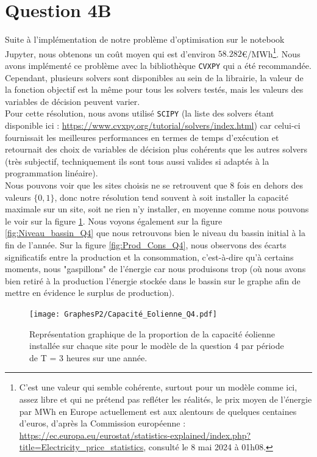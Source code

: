 \documentclass{article}
\begin{document}
\section*{Question 4B}
Suite à l'implémentation de notre problème d'optimisation sur le notebook Jupyter, nous obtenons 
un coût moyen qui est d'environ $\mathbf{58.282}$\euro/MWh\footnote{C'est une valeur qui semble cohérente, surtout pour un modèle comme ici, 
assez libre et qui ne prétend pas refléter les réalités, le prix moyen de l'énergie par MWh en Europe actuellement 
est aux alentours de quelques centaines d'euros, d'après la Commission européenne : 
\url{https://ec.europa.eu/eurostat/statistics-explained/index.php?title=Electricity_price_statistics}, 
consulté le 8 mai 2024 à 01h08.}.
Nous avons implémenté ce problème avec la bibliothèque \verb|CVXPY| qui a été recommandée. Cependant, plusieurs solvers sont disponibles au sein de la librairie, la valeur de la fonction objectif est la même pour tous les solvers testés, mais les valeurs des variables de décision peuvent varier.\\
Pour cette résolution, nous avons utilisé \verb|SCIPY| (la liste des solvers étant disponible ici : \url{https://www.cvxpy.org/tutorial/solvers/index.html})
car celui-ci fournissait les meilleures performances en termes de temps d'exécution et retournait des choix de variables de décision plus cohérents que les autres solvers 
(très subjectif, techniquement ils sont tous aussi valides si adaptés à la programmation linéaire). \\
Nous pouvons voir que les sites choisis ne se retrouvent que 8 fois en dehors des valeurs $\{0,1\}$, donc notre résolution
tend souvent à soit installer la capacité maximale sur un site, soit ne rien n'y installer, en moyenne comme nous pouvons le voir sur la figure \ref{fig:Capacité_Eolienne_Q4}.
Nous voyons également sur la figure \ref{fig:Niveau_bassin_Q4} que nous retrouvons bien le niveau du bassin initial à la fin de l'année. Sur la figure \ref{fig:Prod_Cons_Q4}, nous observons des écarts significatifs entre la production et la consommation, c'est-à-dire 
qu'à certains moments, nous "gaspillons" de l'énergie car nous produisons trop (où nous avons bien retiré à la production l'énergie stockée dans le bassin sur le graphe afin de mettre en évidence le surplus de production).

\begin{figure}[h!]
    \centering
    \texttt{[image: GraphesP2/Capacité\_Eolienne\_Q4.pdf]}
    \caption{Représentation graphique de la proportion de la capacité éolienne installée sur chaque site pour le modèle de la question 4 par période
    de T = 3 heures sur une année.}
    \label{fig:Capacité_Eolienne_Q4}
\end{figure}
\end{document}
